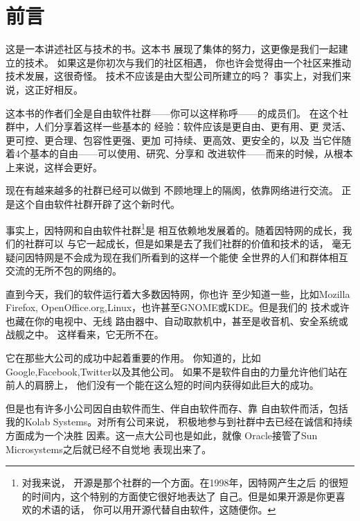 ﻿\section*{前言}

这是一本讲述社区与技术的书。这本书
展现了集体的努力，这更像是我们一起建立的技术。
如果这是你初次与我们的社区相遇，
你也许会觉得由一个社区来推动技术发展，这很奇怪。
技术不应该是由大型公司所建立的吗？
事实上，对我们来说，这正好相反。

这本书的作者们全是自由软件社群——你可以这样称呼——的成员们。
在这个社群中，人们分享着这样一些基本的
经验：软件应该是更自由、更有用、更
灵活、更可控、更合理、包容性更强、更加
可持续、更高效、更安全的，以及
当它伴随着4个基本的自由——可以使用、研究、分享和
改进软件——而来的时候，从根本上来说，这样会更好。

现在有越来越多的社群已经可以做到
不顾地理上的隔阂，依靠网络进行交流。
正是这个自由软件社群开辟了这个新时代。

事实上，因特网和自由软件社群\footnote{对我来说，
  开源是那个社群的一个方面。在1998年，因特网产生之后
  的很短的时间内，这个特别的方面使它很好地表达了
  自己。但是如果开源是你更喜欢的术语的话，
  你可以用开源代替自由软件，这随便你。}是
相互依赖地发展着的。随着因特网的成长，我们的社群可以
与它一起成长，但是如果是去了我们社群的价值和技术的话，
毫无疑问因特网是不会成为现在我们所看到的这样一个能使
全世界的人们和群体相互交流的无所不包的网络的。

直到今天，我们的软件运行着大多数因特网，你也许
至少知道一些，比如Mozilla Firefox,
OpenOffice.org,Linux，也许甚至GNOME或KDE。但是我们的
技术或许也藏在你的电视中、无线
路由器中、自动取款机中，甚至是收音机、安全系统或战舰之中。
这样看来，它无所不在。

它在那些大公司的成功中起着重要的作用。
你知道的，比如Google,Facebook,Twitter以及其他公司。
如果不是软件自由的力量允许他们站在前人的肩膀上，
他们没有一个能在这么短的时间内获得如此巨大的成功。

但是也有许多小公司因自由软件而生、伴自由软件而存、靠
自由软件而活，包括我的Kolab Systems。对所有公司来说，
积极地参与到社群中去已经在诚信和持续方面成为一个决胜
因素。这一点大公司也是如此，就像
Oracle接管了Sun Microsystems之后就已经不自觉地
表现出来了。